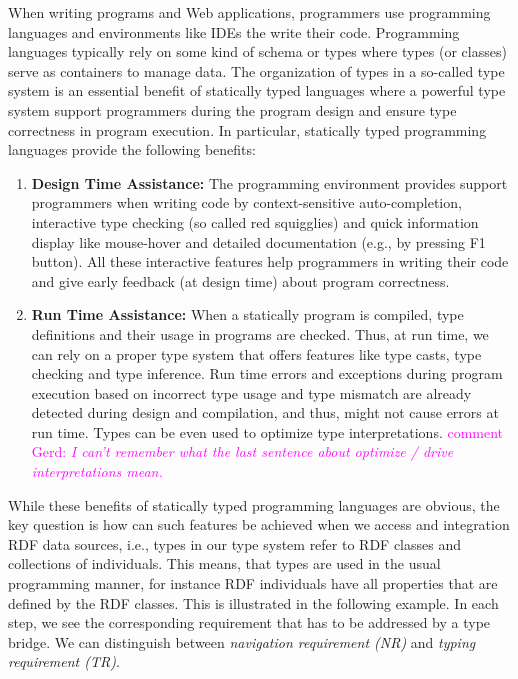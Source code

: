 \documentclass{llncs} %
\newcommand{\ggr}[1]{\textcolor{magenta}{comment Gerd: \textit{#1}}}
\begin{document}
When writing programs and Web applications, programmers use programming languages and environments like IDEs
the write their code. 
Programming languages typically rely on some kind of schema or types
where types (or classes) serve as containers to manage data.
The organization of types in a so-called type system is an essential benefit of statically
typed languages where a powerful type system support programmers during the program design and 
ensure type correctness in program execution. In particular, statically typed programming languages provide the following benefits:


\begin{enumerate}
	\item \textbf{Design Time Assistance:} The programming environment provides support programmers when writing code by
	 context-sensitive auto-completion, interactive type checking (so called red squigglies) and quick information display like mouse-hover
	and detailed documentation (e.g., by pressing F1 button). All these interactive features help programmers in writing their code
	and give early feedback (at design time) about program correctness. 
	\item \textbf{Run Time Assistance:} When a statically program is compiled, type definitions and their usage in programs
	        are checked. Thus, at run time, we can rely on a proper type system that offers features like type casts,
					 type checking and type inference. Run time errors and exceptions during program execution based on
					 incorrect type usage and type mismatch are already detected during design and compilation, and thus, might not
					cause errors at run time. Types can be even used to optimize type interpretations.
					\ggr{I can't remember what the last sentence about optimize / drive interpretations mean.}
					
\end{enumerate}

While these benefits of statically typed programming languages are obvious,
the key question is how can such features be achieved when we access and integration RDF data sources,
i.e., types in our type system refer to RDF classes and collections of individuals.
This means, that types are used in the usual programming manner, for instance RDF individuals
have all properties that are defined by the RDF classes. This is illustrated in the following example.
In each step, we see the corresponding requirement that has to be addressed by a type bridge.
We can distinguish between \emph{navigation requirement (NR)} and \emph{typing requirement (TR)}.
\end{document}
